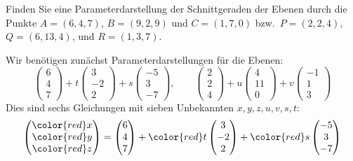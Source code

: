 Finden Sie eine Parameterdarstellung der Schnittgeraden der Ebenen
durch die Punkte $A=(6,4,7)$, $B=(9,2,9)$ und $C=(1,7,0)$ bzw.~$P=(2,2,4)$,
$Q=(6,13,4)$, und $R=(1,3,7)$.

\begin{hinweis}
\end{hinweis}


\begin{loesung}
Wir benötigen zunächst Parameterdarstellungen für die Ebenen:
\[
\begin{pmatrix}6\\4\\7\end{pmatrix}
+t
\begin{pmatrix}3\\-2\\2\end{pmatrix}
+s
\begin{pmatrix}-5\\3\\-7\end{pmatrix}
,\qquad
\begin{pmatrix}2\\2\\4\end{pmatrix}
+u
\begin{pmatrix}4\\11\\0\end{pmatrix}
+v
\begin{pmatrix}-1\\1\\3\end{pmatrix}
\]
Dies sind 
sechs Gleichungen mit sieben Unbekannten $x,y,z,u,v,s,t$:
\begin{align*}
\begin{pmatrix}
{\color{red}x}\\
{\color{red}y}\\
{\color{red}z}
\end{pmatrix}=
\begin{pmatrix}6\\4\\7\end{pmatrix}
+{\color{red}t}
\begin{pmatrix}3\\-2\\2\end{pmatrix}
+{\color{red}s}
\begin{pmatrix}-5\\3\\-7\end{pmatrix}

\end{align*}
\end{loesung}
